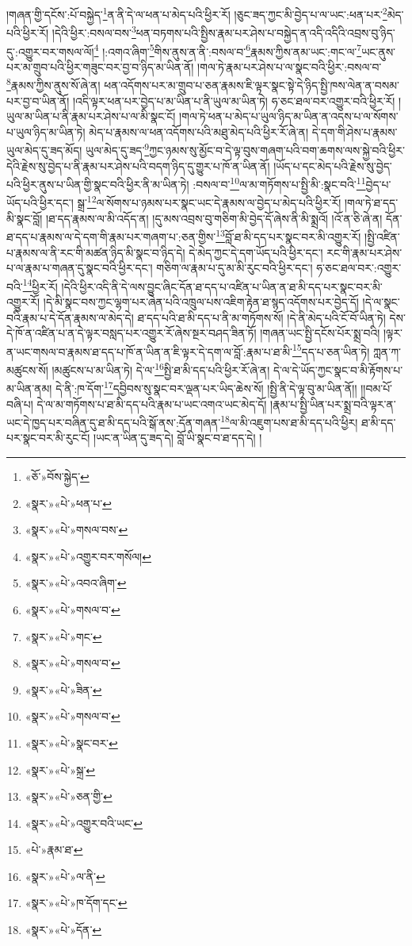 །གཞན་གྱི་དངོས་:པོ་བསྐྱེད་\footnote{«ཅོ་»བོས་སྐྱེད་}ན་ནི་དེ་ལ་ཕན་པ་མེད་པའི་ཕྱིར་རོ། །ཅུང་ཟད་ཀྱང་མི་བྱེད་པ་ལ་ཡང་:ཕན་པར་\footnote{«སྣར་»«པེ་»ཕན་པ་}མེད་པའི་ཕྱིར་རོ། །དེའི་ཕྱིར་:བསལ་བས་\footnote{«སྣར་»«པེ་»གསལ་བས་}ཕན་བཏགས་པའི་སྤྱིས་རྣམ་པར་ཤེས་པ་བསྐྱེད་ན་འདི་འདིའི་འབྲས་བུ་ཉིད་དུ་:འགྱུར་བར་གསལ་ལོ།\footnote{«སྣར་»«པེ་»འགྱུར་བར་གསོལ།} །:འགའ་ཞིག་\footnote{«སྣར་»«པེ་»འབའ་ཞིག་}གིས་ནུས་ན་ནི་:བསལ་བ་\footnote{«སྣར་»«པེ་»གསལ་བ་}རྣམས་ཀྱིས་ནམ་ཡང་:གང་ལ་\footnote{«སྣར་»«པེ་»གང་}ཡང་ནུས་པར་མ་གྲུབ་པའི་ཕྱིར་གཟུང་བར་བྱ་བ་ཉིད་མ་ཡིན་ནོ། །གལ་ཏེ་རྣམ་པར་ཤེས་པ་ལ་སྣང་བའི་ཕྱིར་:བསལ་བ་\footnote{«སྣར་»«པེ་»གསལ་བ་}རྣམས་ཀྱིས་ནུས་སོ་ཞེ་ན། ཕན་འདོགས་པར་མ་གྲུབ་པ་ཅན་རྣམས་ཇི་ལྟར་སྣང་སྟེ་དེ་ཉིད་སྤྱི་ཁས་ལེན་ན་བསམ་པར་བྱ་བ་ཡིན་ནོ། །འདི་ལྟར་ཕན་པར་བྱེད་པ་མ་ཡིན་པ་ནི་ཡུལ་མ་ཡིན་ཏེ། ཧ་ཅང་ཐལ་བར་འགྱུར་བའི་ཕྱིར་རོ། །ཡུལ་མ་ཡིན་པ་ནི་རྣམ་པར་ཤེས་པ་ལ་མི་སྣང་ངོ། །གལ་ཏེ་ཕན་པ་མེད་པ་ཡུལ་ཉིད་མ་ཡིན་ན་འདས་པ་ལ་སོགས་པ་ཡུལ་ཉིད་མ་ཡིན་ཏེ། མེད་པ་རྣམས་ལ་ཕན་འདོགས་པའི་མཐུ་མེད་པའི་ཕྱིར་རོ་ཞེ་ན། དེ་དག་གི་ཤེས་པ་རྣམས་ཡུལ་མེད་དུ་ཟད་མོད། ཡུལ་མེད་དུ་ཟད་\footnote{«སྣར་»«པེ་»ཟིན་}ཀྱང་ཉམས་སུ་མྱོང་བ་དེ་ལྟ་བུས་གཞག་པའི་བག་ཆགས་ལས་སྐྱེ་བའི་ཕྱིར་དེའི་རྗེས་སུ་བྱེད་པ་ནི་རྣམ་པར་ཤེས་པའི་བདག་ཉིད་དུ་གྱུར་པ་ཁོ་ན་ཡིན་ནོ། །ཡོད་པ་དང་མེད་པའི་རྗེས་སུ་བྱེད་པའི་ཕྱིར་ནུས་པ་ཡིན་གྱི་སྣང་བའི་ཕྱིར་ནི་མ་ཡིན་ཏེ། :བསལ་བ་\footnote{«སྣར་»«པེ་»གསལ་བ་}ལ་མ་གཏོགས་པ་སྤྱི་མི་:སྣང་བའི་\footnote{«སྣར་»«པེ་»སྣང་བར་}བྱེད་པ་ཡོད་པའི་ཕྱིར་དང་། སྒྲ་\footnote{«སྣར་»«པེ་»སྐྲ་}ལ་སོགས་པ་ཉམས་པར་སྣང་ཡང་དེ་རྣམས་ལ་བྱེད་པ་མེད་པའི་ཕྱིར་རོ། །གལ་ཏེ་ཐ་དད་མི་སྣང་བློ། །ཐ་དད་རྣམས་ལ་མི་འདོད་ན། །དུ་མས་འབྲས་བུ་གཅིག་མི་བྱེད་དོ་ཞེས་ནི་མི་སྨྲའོ། །འོ་ན་ཅི་ཞེ་ན། དོན་ཐ་དད་པ་རྣམས་ལ་དེ་དག་གི་རྣམ་པར་གཞག་པ་:ཅན་གྱིས་\footnote{«སྣར་»«པེ་»ཅན་གྱི་}བློ་ཐ་མི་དད་པར་སྣང་བར་མི་འགྱུར་རོ། །སྤྱི་འཛིན་པ་རྣམས་ལ་ནི་རང་གི་མཚན་ཉིད་མི་སྣང་བ་ཉིད་དེ། དེ་མེད་ཀྱང་དེ་དག་ཡོད་པའི་ཕྱིར་དང་། རང་གི་རྣམ་པར་ཤེས་པ་ལ་རྣམ་པ་གཞན་དུ་སྣང་བའི་ཕྱིར་དང་། གཅིག་ལ་རྣམ་པ་དུ་མ་མི་རུང་བའི་ཕྱིར་དང་། ཧ་ཅང་ཐལ་བར་:འགྱུར་བའི་\footnote{«སྣར་»«པེ་»འགྱུར་བའི་ཡང་}ཕྱིར་རོ། །དེའི་ཕྱིར་འདི་ནི་དེ་ལས་བྱུང་ཞིང་དོན་ཐ་དད་པ་འཛིན་པ་ཡིན་ན་ཐ་མི་དད་པར་སྣང་བར་མི་འགྱུར་རོ། །དེ་མི་སྣང་བས་ཀྱང་ལྷག་པར་ཞེན་པའི་འཁྲུལ་པས་འཇིག་རྟེན་ཐ་སྙད་འདོགས་པར་བྱེད་དོ། །དེ་ལ་སྣང་བའི་རྣམ་པ་དེ་དོན་རྣམས་ལ་མེད་དེ། ཐ་དད་པའི་ཐ་མི་དད་པ་ནི་མ་གཏོགས་སོ། །དེ་ནི་མེད་པའི་ངོ་བོ་ཡིན་ཏེ། དེས་དེ་ཁོ་ན་འཛིན་པ་ན་དེ་ལྟར་བསླད་པར་འགྱུར་རོ་ཞེས་སྔར་བཤད་ཟིན་ཏོ། །གཞན་ཡང་སྤྱི་དངོས་པོར་སྨྲ་བའི། །ལྟར་ན་ཡང་གསལ་བ་རྣམས་ཐ་དད་པ་ཁོ་ན་ཡིན་ན་ཇི་ལྟར་དེ་དག་ལ་བློ་:རྣམ་པ་ཐ་མི་\footnote{«པེ་»རྣམ་ཐ་}དད་པ་ཅན་ཡིན་ཏེ། ཀླན་ཀ་མཚུངས་སོ། །མཚུངས་པ་མ་ཡིན་ཏེ། དེ་ལ་\footnote{«སྣར་»«པེ་»ལ་ནི་}སྤྱི་ཐ་མི་དད་པའི་ཕྱིར་རོ་ཞེ་ན། དེ་ལ་དེ་ཡོད་ཀྱང་སྣང་བ་མི་རྟོགས་པ་མ་ཡིན་ནམ། དེ་ནི་:ཁ་དོག་\footnote{«སྣར་»«པེ་»ཁ་དོག་དང་}དབྱིབས་སུ་སྣང་བར་ལྡན་པར་ཡིད་ཆེས་སོ། །སྤྱི་ནི་དེ་ལྟ་བུ་མ་ཡིན་ནོ།། །།བམ་པོ་བཞི་པ། དེ་ལ་མ་གཏོགས་པ་ཐ་མི་དད་པའི་རྣམ་པ་ཡང་འགའ་ཡང་མེད་དོ། །རྣམ་པ་སྤྱི་ཡིན་པར་སྨྲ་བའི་ལྟར་ན་ཡང་དེ་ཁྱད་པར་བཞིན་དུ་ཐ་མི་དད་པའི་སྒོ་ནས་:དོན་གཞན་\footnote{«སྣར་»«པེ་»དོན་}ལ་མི་འཇུག་པས་ཐ་མི་དད་པའི་ཕྱིར། ཐ་མི་དད་པར་སྣང་བར་མི་རུང་ངོ། །ཡང་ན་ཡིན་དུ་ཟད་དེ། བློ་ཡི་སྣང་བ་ཐ་དད་དེ། །
